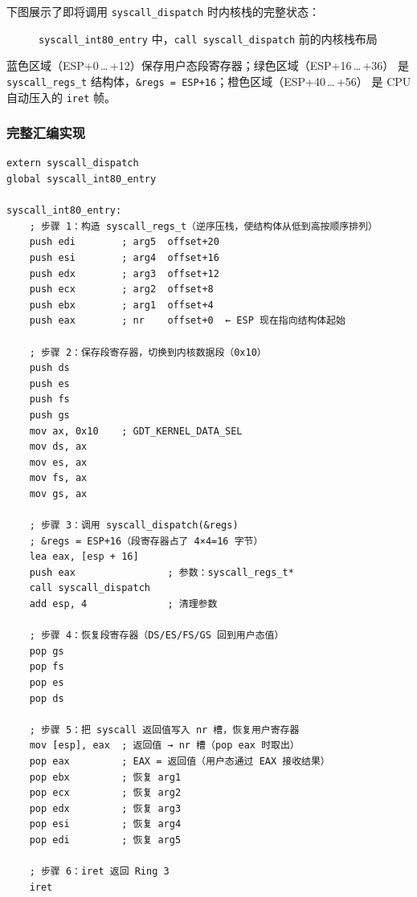 下图展示了即将调用 \texttt{syscall\_dispatch} 时内核栈的完整状态：

\begin{figure}[H]
  \centering
  
  \caption{\texttt{syscall\_int80\_entry} 中，\texttt{call syscall\_dispatch}
           前的内核栈布局}
  \label{fig:int80-stack}
\end{figure}

蓝色区域（ESP+0\,\ldots\,+12）保存用户态段寄存器；绿色区域（ESP+16\,\ldots\,+36）
是 \texttt{syscall\_regs\_t} 结构体，\texttt{\&regs = ESP+16}；橙色区域（ESP+40\,\ldots\,+56）
是 CPU 自动压入的 \texttt{iret} 帧。

\subsubsection{完整汇编实现}

\begin{lstlisting}[style=nasmstyle]
extern syscall_dispatch
global syscall_int80_entry

syscall_int80_entry:
    ; 步骤 1：构造 syscall_regs_t（逆序压栈，使结构体从低到高按顺序排列）
    push edi        ; arg5  offset+20
    push esi        ; arg4  offset+16
    push edx        ; arg3  offset+12
    push ecx        ; arg2  offset+8
    push ebx        ; arg1  offset+4
    push eax        ; nr    offset+0  ← ESP 现在指向结构体起始

    ; 步骤 2：保存段寄存器，切换到内核数据段（0x10）
    push ds
    push es
    push fs
    push gs
    mov ax, 0x10    ; GDT_KERNEL_DATA_SEL
    mov ds, ax
    mov es, ax
    mov fs, ax
    mov gs, ax

    ; 步骤 3：调用 syscall_dispatch(&regs)
    ; &regs = ESP+16（段寄存器占了 4×4=16 字节）
    lea eax, [esp + 16]
    push eax                ; 参数：syscall_regs_t*
    call syscall_dispatch
    add esp, 4              ; 清理参数

    ; 步骤 4：恢复段寄存器（DS/ES/FS/GS 回到用户态值）
    pop gs
    pop fs
    pop es
    pop ds

    ; 步骤 5：把 syscall 返回值写入 nr 槽，恢复用户寄存器
    mov [esp], eax  ; 返回值 → nr 槽（pop eax 时取出）
    pop eax         ; EAX = 返回值（用户态通过 EAX 接收结果）
    pop ebx         ; 恢复 arg1
    pop ecx         ; 恢复 arg2
    pop edx         ; 恢复 arg3
    pop esi         ; 恢复 arg4
    pop edi         ; 恢复 arg5

    ; 步骤 6：iret 返回 Ring 3
    iret
\end{lstlisting}


